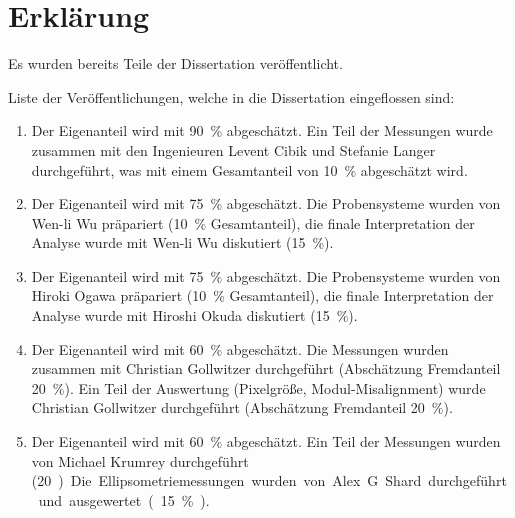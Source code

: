 \noindent
\pagestyle{empty}

\section*{Erklärung}

Es wurden bereits Teile der Dissertation veröffentlicht.
\vspace{2ex}

Liste der Veröffentlichungen, welche in die Dissertation eingeflossen sind:

\begin{enumerate}[label=\arabic*) ]
    \item {} 

        Der Eigenanteil wird mit \SI{90}{\%} abgeschätzt.
        Ein Teil der Messungen wurde zusammen mit den Ingenieuren Levent Cibik und Stefanie Langer durchgeführt, was mit einem Gesamtanteil von \SI{10}{\%} abgeschätzt wird.

    \item {} 

        Der Eigenanteil wird mit \SI{75}{\%} abgeschätzt.
        Die Probensysteme wurden von Wen-li Wu präpariert (\SI{10}{\%} Gesamtanteil), die finale Interpretation der Analyse wurde mit Wen-li Wu diskutiert (\SI{15}{\%}).

    \item {}

        Der Eigenanteil wird mit \SI{75}{\%} abgeschätzt.
        Die Probensysteme wurden von Hiroki Ogawa präpariert (\SI{10}{\%} Gesamtanteil), die finale Interpretation der Analyse wurde mit Hiroshi Okuda diskutiert (\SI{15}{\%}).

    \item {} 

        Der Eigenanteil wird mit \SI{60}{\%} abgeschätzt.
        Die Messungen wurden zusammen mit Christian Gollwitzer durchgeführt (Abschätzung Fremdanteil \SI{20}{\%}).
        Ein Teil der Auswertung (Pixelgröße, Modul-Misalignment) wurde Christian Gollwitzer durchgeführt (Abschätzung Fremdanteil \SI{20}{\%}).

    \item {} 

        Der Eigenanteil wird mit \SI{60}{\%} abgeschätzt.
        Ein Teil der Messungen wurden von Michael Krumrey durchgeführt (\SI{20}).
        Die Ellipsometriemessungen wurden von Alex G. Shard durchgeführt und ausgewertet (\SI{15}{\%}).


\end{enumerate}
